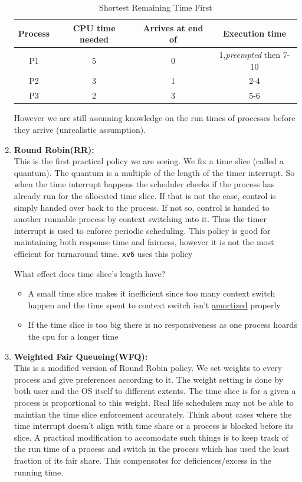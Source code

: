\documentclass[12pt]{article}
\begin{document}
\begin{enumerate}
    \begin{table}[h]
        \centering
        \begin{tabular}{|c|c|c|c|}
        \hline
        \textbf{Process} & \textbf{CPU time needed} & \textbf{Arrives at end of} & \textbf{Execution time} \\
        \hline
        P1 & 5 & 0 & 1,\textit{preempted} then 7-10 \\
        \hline
        P2 & 3 & 1 & 2-4 \\
        \hline
        P3 & 2 & 3 & 5-6 \\
        \hline
        \end{tabular}
        \caption{Shortest Remaining Time First}
        \label{tab:SRTF}
    \end{table}
    However we are still assuming knowledge on the run times of processes before they arrive (unrealistic assumption).
\item \textbf{Round Robin(RR):}\\ This is the first practical policy we are seeing. We fix a time slice (called a quantum). The quantum is a multiple of the length of the timer interrupt.
So when the time interrupt happens the scheduler checks if the process has already run for the allocated time slice. If that is not the case, control is simply handed over back to the process. If not so, control is handed to another
runnable process by context switching into it. Thus the timer interrupt is used to enforce periodic scheduling. 
This policy is good for maintaining both response time and fairness, however it is not the most efficient for turnaround time. \texttt{xv6} uses this policy

What effect does time slice's length have?
\begin{itemize}[topsep=0pt, partopsep=0pt, itemsep=0pt, parsep=0pt]
    \item A small time slice makes it inefficient since too many context switch happen and the time spent to context switch isn't \href{https://english.stackexchange.com/a/138566}{amortized} properly
    \item If the time slice is too big there is no responsiveness as one process hoards the cpu for a longer time
\end{itemize}

\item \textbf{Weighted Fair Queueing(WFQ):} \\This is a modified version of Round Robin policy. We set weights to every process and give preferences according to it.
The weight setting is done by both user and the OS itself to different extents. The time slice is for a given a process is proportional to this weight. Real life schedulers may not be able to maintian the time slice enforcement accurately. Think about cases where the time interrupt
doesn't align with time share or a process is blocked before its slice. A practical modification to accomodate such things is to keep track of the run time of a process and switch in the process which has used the least fraction of its fair share. This compensates for deficiences/excess in the running time.
 

\end{enumerate}
\end{document}
